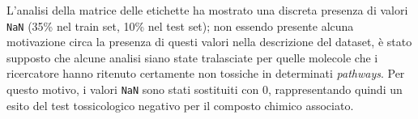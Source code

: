L'analisi della matrice delle etichette ha mostrato una discreta presenza di valori \texttt{NaN} (35\% nel train set, 10\% nel test set); non essendo presente alcuna motivazione circa la presenza di questi valori nella descrizione del dataset, è stato supposto che alcune analisi siano state tralasciate per quelle molecole che i ricercatore hanno ritenuto certamente non tossiche in determinati \textit{pathways}. Per questo motivo, i valori \texttt{NaN} sono stati sostituiti con $0$, rappresentando quindi un esito del test tossicologico negativo per il composto chimico associato.
\begin{figure}[!ht]
	\centering
	\quad
	\quad
	\quad
	\\	\quad
	\quad

\end{figure}
